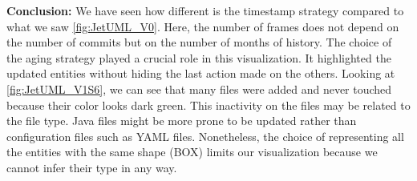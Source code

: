 \bigbreak
\noindent
\textbf{Conclusion:}
We have seen how different is the timestamp strategy compared to what we saw \autoref{fig:JetUML_V0}. Here, the number of frames does not depend on the number of commits but on the number of months of history. 
The choice of the aging strategy played a crucial role in this visualization. It highlighted the updated entities without hiding the last action made on the others. Looking at \autoref{fig:JetUML_V1S6}, we can see that many files were added and never touched because their color looks dark green. This inactivity on the files may be related to the file type. Java files might be more prone to be updated rather than configuration files such as YAML files. Nonetheless, the choice of representing all the entities with the same shape (BOX) limits our visualization because we cannot infer their type in any way. 



